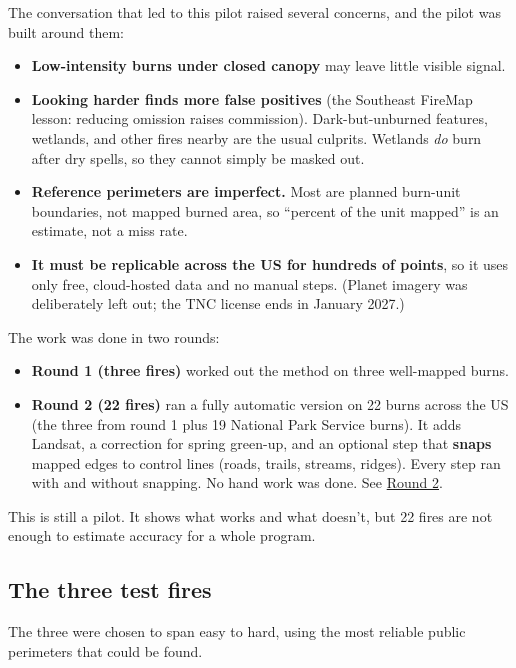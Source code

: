\documentclass[
]{article}
\providecommand{\tightlist}{%
  \setlength{\itemsep}{0pt}\setlength{\parskip}{0pt}}
\begin{document}
The conversation that led to this pilot raised several concerns, and the
pilot was built around them:

\begin{itemize}
\tightlist
\item
  \textbf{Low-intensity burns under closed canopy} may leave little
  visible signal.
\item
  \textbf{Looking harder finds more false positives} (the Southeast
  FireMap lesson: reducing omission raises commission).
  Dark-but-unburned features, wetlands, and other fires nearby are the
  usual culprits. Wetlands \emph{do} burn after dry spells, so they
  cannot simply be masked out.
\item
  \textbf{Reference perimeters are imperfect.} Most are planned
  burn-unit boundaries, not mapped burned area, so ``percent of the unit
  mapped'' is an estimate, not a miss rate.
\item
  \textbf{It must be replicable across the US for hundreds of points},
  so it uses only free, cloud-hosted data and no manual steps. (Planet
  imagery was deliberately left out; the TNC license ends in January
  2027.)
\end{itemize}

The work was done in two rounds:

\begin{itemize}
\tightlist
\item
  \textbf{Round 1 (three fires)} worked out the method on three
  well-mapped burns.
\item
  \textbf{Round 2 (22 fires)} ran a fully automatic version on 22 burns
  across the US (the three from round 1 plus 19 National Park Service
  burns). It adds Landsat, a correction for spring green-up, and an
  optional step that \textbf{snaps} mapped edges to control lines
  (roads, trails, streams, ridges). Every step ran with and without
  snapping. No hand work was done. See
  \hyperref[round-2-22-fires-fully-automatic-with-and-without-snapping]{Round
  2}.
\end{itemize}

This is still a pilot. It shows what works and what doesn't, but 22
fires are not enough to estimate accuracy for a whole program.

\subsection{The three test fires}\label{the-three-test-fires}

The three were chosen to span easy to hard, using the most reliable
public perimeters that could be found.
\end{document}
